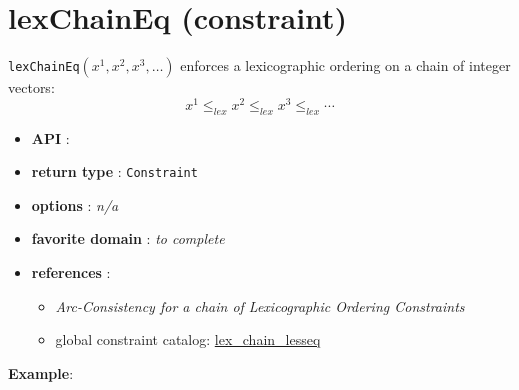 \label{lexchaineq}
\hypertarget{lexchaineq}{}

\section{lexChainEq (constraint)}\label{lexchaineq:lexchaineqconstraint}\hypertarget{lexchaineq:lexchaineqconstraint}{}
\begin{notedef}
\texttt{lexChainEq}$(x^1 ,x^2 ,x^3,\ldots)$ enforces a lexicographic ordering on a chain of integer vectors:
$$x^1 \le_{lex} x^2 \le_{lex} x^3 \le_{lex}\cdots$$
\end{notedef}

\begin{itemize}
	\item \textbf{API} : 
	\item \textbf{return type} : \texttt{Constraint}
	\item \textbf{options} : \emph{n/a}
	\item \textbf{favorite domain} : \emph{to complete}
	\item \textbf{references} :
      \begin{itemize}
      \item \cite{BeldiceanuSICS02} \emph{Arc-Consistency for a chain of Lexicographic Ordering Constraints} 
      \item global constraint catalog: \href{http://www.emn.fr/x-info/sdemasse/gccat/Clex_chain_lesseq.html}{lex\_chain\_lesseq}
      \end{itemize}
\end{itemize}

\textbf{Example}:
